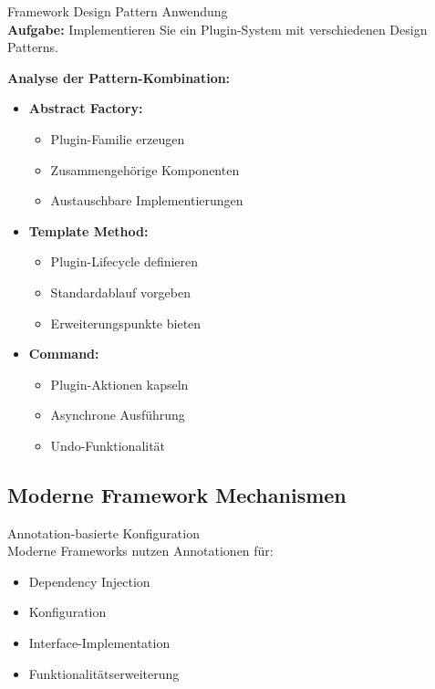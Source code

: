 \begin{example2}{Framework Design Pattern Anwendung}\\
\textbf{Aufgabe:}
Implementieren Sie ein Plugin-System mit verschiedenen Design Patterns.

\textbf{Analyse der Pattern-Kombination:}
\begin{itemize}
    \item \textbf{Abstract Factory:}
    \begin{itemize}
        \item Plugin-Familie erzeugen
        \item Zusammengehörige Komponenten
        \item Austauschbare Implementierungen
    \end{itemize}
    
    \item \textbf{Template Method:}
    \begin{itemize}
        \item Plugin-Lifecycle definieren
        \item Standardablauf vorgeben
        \item Erweiterungspunkte bieten
    \end{itemize}
    
    \item \textbf{Command:}
    \begin{itemize}
        \item Plugin-Aktionen kapseln
        \item Asynchrone Ausführung
        \item Undo-Funktionalität
    \end{itemize}
\end{itemize}
\end{example2}


\subsection{Moderne Framework Mechanismen}

\begin{definition}{Annotation-basierte Konfiguration}\\
Moderne Frameworks nutzen Annotationen für:
\begin{itemize}
    \item Dependency Injection
    \item Konfiguration
    \item Interface-Implementation
    \item Funktionalitätserweiterung
\end{itemize}
\end{definition}

